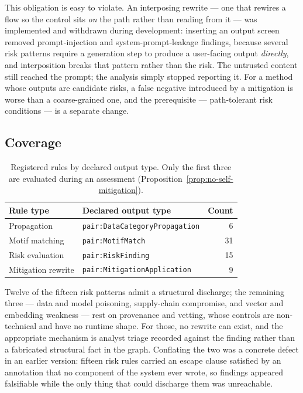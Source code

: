 \documentclass[11pt,a4paper]{article}
\theoremstyle{definition}
\theoremstyle{plain}
\begin{document}
\noindent This obligation is easy to violate. An interposing rewrite --- one
that rewires a flow so the control sits \emph{on} the path rather than reading
from it --- was implemented and withdrawn during development: inserting an
output screen removed prompt-injection and system-prompt-leakage findings,
because several risk patterns require a generation step to produce a user-facing
output \emph{directly}, and interposition breaks that pattern rather than the
risk. The untrusted content still reached the prompt; the analysis simply
stopped reporting it. For a method whose outputs are candidate risks, a false
negative introduced by a mitigation is worse than a coarse-grained one, and the
prerequisite --- path-tolerant risk conditions --- is a separate change.

\subsection{Coverage}

\begin{table}[ht]
\centering
\begin{tabular}{@{}llr@{}}
\toprule
Rule type & Declared output type & Count \\
\midrule
Propagation        & \texttt{pair:DataCategoryPropagation} & 6 \\
Motif matching     & \texttt{pair:MotifMatch}              & 31 \\
Risk evaluation    & \texttt{pair:RiskFinding}             & 15 \\
Mitigation rewrite & \texttt{pair:MitigationApplication}   & 9 \\
\bottomrule
\end{tabular}
\caption{Registered rules by declared output type. Only the first three are
evaluated during an assessment (Proposition~\ref{prop:no-self-mitigation}).}
\label{tab:rules}
\end{table}

Twelve of the fifteen risk patterns admit a structural discharge; the remaining
three --- data and model poisoning, supply-chain compromise, and vector and
embedding weakness --- rest on provenance and vetting, whose controls are
non-technical and have no runtime shape. For those, no rewrite can exist, and
the appropriate mechanism is analyst triage recorded against the finding rather
than a fabricated structural fact in the graph. Conflating the two was a
concrete defect in an earlier version: fifteen risk rules carried an escape
clause satisfied by an annotation that no component of the system ever wrote, so
findings appeared falsifiable while the only thing that could discharge them was
unreachable.
\end{document}
